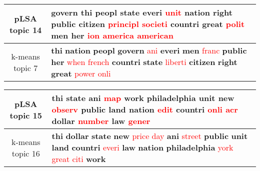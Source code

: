 \begin{center}\begin{tabularx}{\textwidth} {
  | c | >{\raggedright\arraybackslash}X | } \hline 
pLSA topic 14 & \textbf{govern} \textbf{thi} \textbf{peopl} \textbf{state} \textbf{everi} \textcolor{red}{unit} \textbf{nation} \textbf{right} \textbf{public} \textbf{citizen} \textcolor{red}{principl} \textcolor{red}{societi} \textbf{countri} \textbf{great} \textcolor{red}{polit} \textbf{men} \textbf{her} \textcolor{red}{ion} \textcolor{red}{america} \textcolor{red}{american} \\ \hline 
k-means topic 7 & \textbf{thi} \textbf{nation} \textbf{peopl} \textbf{govern} \textcolor{red}{ani} \textbf{everi} \textbf{men} \textcolor{red}{franc} \textbf{public} \textbf{her} \textcolor{red}{when} \textcolor{red}{french} \textbf{countri} \textbf{state} \textcolor{red}{liberti} \textbf{citizen} \textbf{right} \textbf{great} \textcolor{red}{power} \textcolor{red}{onli} \\ \hline 
\end{tabularx}

\end{center}

\begin{center}\begin{tabularx}{\textwidth} {
  | c | >{\raggedright\arraybackslash}X | } \hline 
pLSA topic 15 & \textbf{thi} \textbf{state} \textbf{ani} \textcolor{red}{map} \textbf{work} \textbf{philadelphia} \textbf{unit} \textbf{new} \textcolor{red}{observ} \textbf{public} \textbf{land} \textbf{nation} \textcolor{red}{edit} \textbf{countri} \textcolor{red}{onli} \textcolor{red}{acr} \textbf{dollar} \textcolor{red}{number} \textbf{law} \textcolor{red}{gener} \\ \hline 
k-means topic 16 & \textbf{thi} \textbf{dollar} \textbf{state} \textbf{new} \textcolor{red}{price} \textcolor{red}{day} \textbf{ani} \textcolor{red}{street} \textbf{public} \textbf{unit} \textbf{land} \textbf{countri} \textcolor{red}{everi} \textbf{law} \textbf{nation} \textbf{philadelphia} \textcolor{red}{york} \textcolor{red}{great} \textcolor{red}{citi} \textbf{work} \\ \hline 
\end{tabularx}

\end{center}

